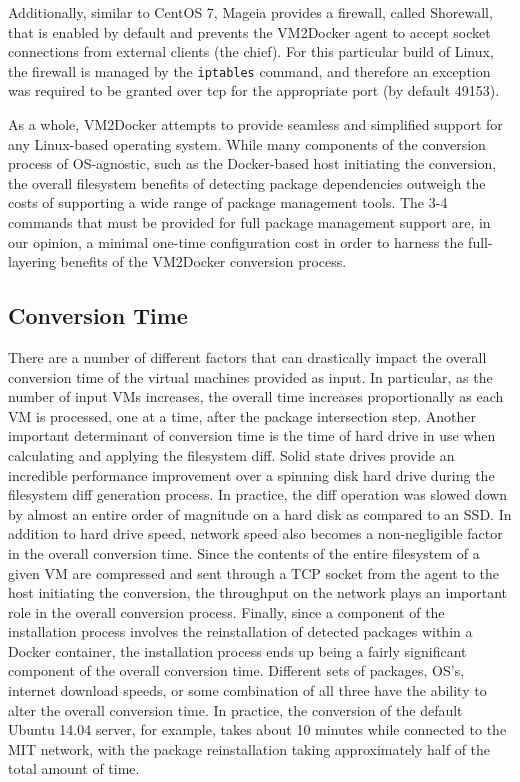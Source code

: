 Additionally, similar to CentOS 7, Mageia provides a firewall, called Shorewall, that is enabled by default and prevents the VM2Docker agent to accept socket connections from external clients (the chief). For this particular build of Linux, the firewall is managed by the \texttt{iptables} command, and therefore an exception was required to be granted over tcp for the appropriate port (by default 49153).


As a whole, VM2Docker attempts to provide seamless and simplified support for any Linux-based operating system. While many components of the conversion process of OS-agnostic, such as the Docker-based host initiating the conversion, the overall filesystem benefits of detecting package dependencies outweigh the costs of supporting a wide range of package management tools. The 3-4 commands that must be provided for full package management support are, in our opinion, a minimal one-time configuration cost in order to harness the full-layering benefits of the VM2Docker conversion process.

\subsection{Conversion Time}
There are a number of different factors that can drastically impact the overall conversion time of the virtual machines provided as input. In particular, as the number of input VMs increases, the overall time increases proportionally as each VM is processed, one at a time, after the package intersection step. Another important determinant of conversion time is the time of hard drive in use when calculating and applying the filesystem diff. Solid state drives provide an incredible performance improvement over a spinning disk hard drive during the filesystem diff generation process. In practice, the diff operation was slowed down by almost an entire order of magnitude on a hard disk as compared to an SSD. In addition to hard drive speed, network speed also becomes a non-negligible factor in the overall conversion time. Since the contents of the entire filesystem of a given VM are compressed and sent through a TCP socket from the agent to the host initiating the conversion, the throughput on the network plays an important role in the overall conversion process. Finally, since a component of the installation process involves the reinstallation of detected packages within a Docker container, the installation process ends up being a fairly significant component of the overall conversion time. Different sets of packages, OS's, internet download speeds, or some combination of all three have the ability to alter the overall conversion time. In practice, the conversion of the default Ubuntu 14.04 server, for example, takes about 10 minutes while connected to the MIT network, with the package reinstallation taking approximately half of the total amount of time.




